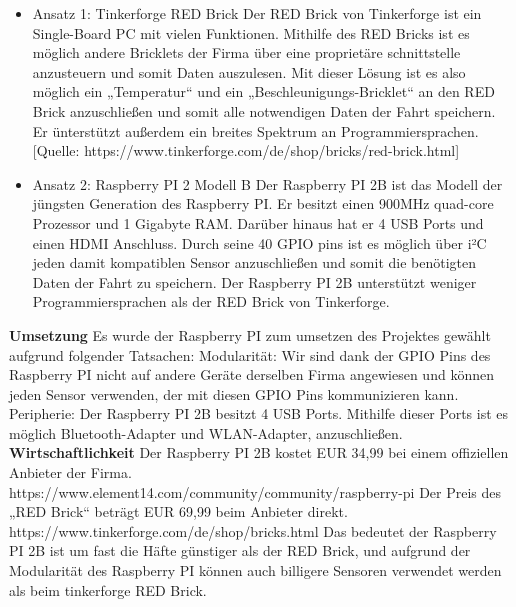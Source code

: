 \begin{itemize}
\item Ansatz 1: Tinkerforge RED Brick
Der RED Brick von Tinkerforge ist ein Single-Board PC mit vielen Funktionen.
Mithilfe des RED Bricks ist es möglich andere Bricklets der Firma über eine proprietäre schnittstelle anzusteuern und somit Daten auszulesen.
Mit dieser Lösung ist es also möglich ein „Temperatur“ und ein „Beschleunigungs-Bricklet“ an den RED Brick anzuschließen und somit alle notwendigen Daten der Fahrt speichern.
Er ünterstützt außerdem ein breites Spektrum an Programmiersprachen.
[Quelle: https://www.tinkerforge.com/de/shop/bricks/red-brick.html]

\item Ansatz 2: Raspberry PI 2 Modell B
Der Raspberry PI 2B ist das Modell der jüngsten Generation des Raspberry PI. Er besitzt einen 900MHz quad-core Prozessor und 1 Gigabyte RAM. Darüber hinaus hat er 4 USB Ports und einen HDMI Anschluss. Durch seine 40 GPIO pins ist es möglich über i²C jeden damit kompatiblen Sensor anzuschließen und somit die benötigten Daten der Fahrt zu speichern.
Der Raspberry PI 2B unterstützt weniger Programmiersprachen als der RED Brick von Tinkerforge.
\end{itemize}

\textbf{Umsetzung\newline}
\newline
Es wurde der Raspberry PI zum umsetzen des Projektes gewählt aufgrund folgender Tatsachen:
Modularität:
Wir sind dank der GPIO Pins des Raspberry PI nicht auf andere Geräte derselben Firma angewiesen und können jeden Sensor verwenden, der mit diesen GPIO Pins kommunizieren kann.
Peripherie:
Der Raspberry PI 2B besitzt 4 USB Ports. Mithilfe dieser Ports ist es möglich Bluetooth-Adapter und WLAN-Adapter, anzuschließen.
\newpage
\textbf{Wirtschaftlichkeit\newline}
\newline
Der Raspberry PI 2B kostet EUR 34,99 bei einem offiziellen Anbieter der Firma.
https://www.element14.com/community/community/raspberry-pi
Der Preis des „RED Brick“ beträgt EUR 69,99 beim Anbieter direkt.
https://www.tinkerforge.com/de/shop/bricks.html
Das bedeutet der Raspberry PI 2B ist um fast die Häfte günstiger als der RED Brick, und aufgrund der
Modularität des Raspberry PI können auch billigere Sensoren verwendet werden als beim tinkerforge
RED Brick.

